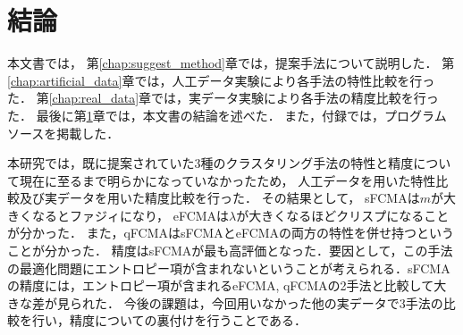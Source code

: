 \documentclass[a4j,12pt,dvipdfmx,oneside]{jsbook}
\theoremstyle{definition}
\begin{document}
  
\chapter{結論}\label{chap:conclusion}
本文書では，
第\ref{chap:suggest_method}章では，提案手法について説明した．
第\ref{chap:artificial_data}章では，人工データ実験により各手法の特性比較を行った．
第\ref{chap:real_data}章では，実データ実験により各手法の精度比較を行った．
最後に第\ref{chap:conclusion}章では，本文書の結論を述べた．
また，付録では，プログラムソースを掲載した．

本研究では，既に提案されていた3種のクラスタリング手法の特性と精度について現在に至るまで明らかになっていなかったため，
人工データを用いた特性比較及び実データを用いた精度比較を行った．
その結果として，
sFCMAは$m$が大きくなるとファジィになり，
eFCMAは$\lambda$が大きくなるほどクリスプになることが分かった．
また，qFCMAはsFCMAとeFCMAの両方の特性を併せ持つということが分かった．
精度はsFCMAが最も高評価となった．要因として，この手法の最適化問題にエントロピー項が含まれないということが考えられる．sFCMAの精度には，エントロピー項が含まれるeFCMA, qFCMAの2手法と比較して大きな差が見られた．
今後の課題は，今回用いなかった他の実データで$3$手法の比較を行い，精度についての裏付けを行うことである．
\end{document}
